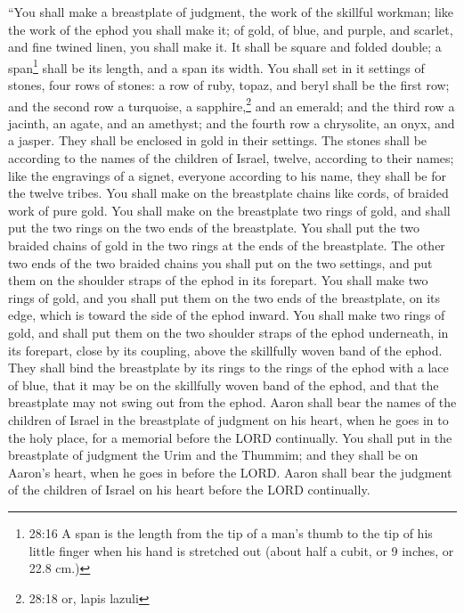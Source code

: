 \myverse{}“You shall make a breastplate of judgment, the work of the skillful
workman; like the work of the ephod you shall make it; of gold, of blue, and purple, and scarlet, and
fine twined linen, you shall make it.
\myverse{}It shall be square and folded double; a span\footnote{28:16 A span is the length from the tip of a man’s thumb to the tip of his little finger when his hand
	is stretched out (about half a cubit, or 9 inches, or 22.8 cm.)} shall be its length, and a span
its width.
\myverse{}You shall set in it settings of stones, four rows of stones: a row of ruby,
topaz, and beryl shall be the first row;
\myverse{}and the second row a turquoise, a sapphire,\footnote{28:18 or, lapis lazuli} and an emerald;
\myverse{}and the third row a jacinth, an agate, and an amethyst;
\myverse{}and the fourth row a chrysolite, an onyx, and a jasper. They shall be enclosed
in gold in their settings.
\myverse{}The stones shall be according to the names of the children of Israel, twelve,
according to their names; like the engravings of a signet, everyone according to his name, they shall
be for the twelve tribes.
\myverse{}You shall make on the breastplate chains like cords, of braided work of pure
gold.
\myverse{}You shall make on the breastplate two rings of gold, and shall put the two
rings on the two ends of the breastplate.
\myverse{}You shall put the two braided chains of gold in the two rings at the ends
of the breastplate.
\myverse{}The other two ends of the two braided chains you shall put on the two settings,
and put them on the shoulder straps of the ephod in its forepart.
\myverse{}You shall make two rings of gold, and you shall put them on the two ends
of the breastplate, on its edge, which is toward the side of the ephod inward.
\myverse{}You shall make two rings of gold, and shall put them on the two shoulder
straps of the ephod underneath, in its forepart, close by its coupling, above the skillfully woven band
of the ephod.
\myverse{}They shall bind the breastplate by its rings to the rings of the ephod with
a lace of blue, that it may be on the skillfully woven band of the ephod, and that the breastplate may
not swing out from the ephod.
\myverse{}Aaron shall bear the names of the children of Israel in the breastplate of
judgment on his heart, when he goes in to the holy place, for a memorial before the LORD continually.
\myverse{}You shall put in the breastplate of judgment the Urim and the Thummim; and
they shall be on Aaron’s heart, when he goes in before the LORD. Aaron shall bear the judgment of the
children of Israel on his heart before the LORD continually.


